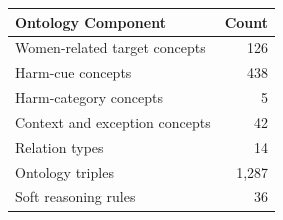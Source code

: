 \begin{tabular}{lr}
\toprule
\textbf{Ontology Component} & \textbf{Count} \\
\midrule
Women-related target concepts & 126 \\
Harm-cue concepts & 438 \\
Harm-category concepts & 5 \\
Context and exception concepts & 42 \\
Relation types & 14 \\
Ontology triples & 1,287 \\
Soft reasoning rules & 36 \\
\bottomrule
\end{tabular}
